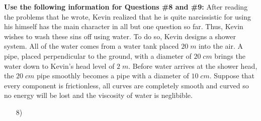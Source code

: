 \documentclass{article}
\begin{document}
	\textbf{Use the following information for Questions \#8 and \#9: }After reading the problems that he wrote, Kevin realized that he is quite narcissistic for using his himself has the main character in all but one question so far. Thus, Kevin wishes to wash these sins off using water. To do so, Kevin designs a shower system. All of the water comes from a water tank placed $20\;m$ into the air. A pipe, placed perpendicular to the ground, with a diameter of $20\;cm$ brings the water down to Kevin's head level of $2\;m$. Before water arrives at the shower head, the $20\;cm$ pipe smoothly becomes a pipe with a diameter of $10\;cm$. Suppose that every component is frictionless, all curves are completely smooth and curved so no energy will be lost and the viscosity of water is neglibible.
	\begin{enumerate}
		\item[8)]
	\end{enumerate}
\end{document}
